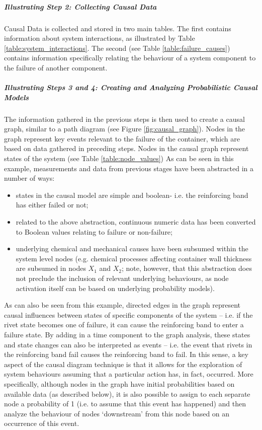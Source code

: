 \subparagraph{Illustrating Step 2: Collecting Causal Data}
Causal Data is collected and stored in two main tables. The first contains information about system interactions, as illustrated by Table \ref{table:system_interactions}. The second (see Table \ref{table:failure_causes}) contains information specifically relating the behaviour of a system component to the failure of another component.
\subparagraph{Illustrating Steps 3 and 4: Creating and Analyzing Probabilistic Causal Models}
The information gathered in the previous steps is then used to create a causal graph, similar to a path diagram (see Figure \ref{fig:causal_graph}). Nodes in the graph represent key events relevant to the failure of the container, which are based on data gathered in preceding steps. Nodes in the causal graph represent states of the system (see Table \ref{table:node_values})
\newl As can be seen in this example, measurements and data from previous stages have been abstracted in a number of ways:	
    \begin{itemize}[noitemsep]
    \item states in the causal model are simple and boolean- i.e. the reinforcing band has either failed or not;
    \item related to the above abstraction, continuous numeric data has been converted to Boolean values relating to failure or non-failure;
    \item underlying chemical and mechanical causes have been subsumed within the system level nodes (e.g. chemical processes affecting container wall thickness are subsumed in nodes $X_1$ and $X_2$; note, however, that this abstraction does not preclude the inclusion of relevant underlying behaviours, as node activation itself can be based on underlying probability models).
    \end{itemize}
As can also be seen from this example, directed edges in the graph represent causal influences between states of specific components of the system -- i.e. if the rivet state becomes one of failure, it can cause the reinforcing band to enter a failure state. By adding in a time component to the graph analysis, these states and state changes can also be interpreted as events -- i.e. the event that rivets in the reinforcing band fail causes the reinforcing band to fail. In this sense, a key aspect of the causal diagram technique is that it allows for the exploration of system behaviours assuming that a particular action has, in fact, occurred. \newl More specifically, although nodes in the graph have initial probabilities based on available data (as described below), it is also possible to assign to each separate node a probability of 1 (i.e. to assume that this event has happened) and then analyze the behaviour of nodes `downstream' from this node based on an occurrence of this event.
